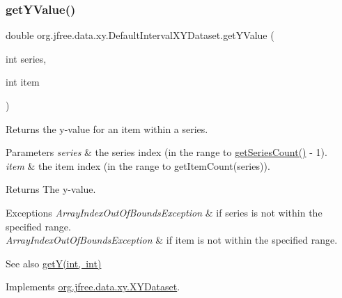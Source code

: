 \subsubsection{\texorpdfstring{get\+Y\+Value()}{getYValue()}}
{\footnotesize\ttfamily double org.\+jfree.\+data.\+xy.\+Default\+Interval\+X\+Y\+Dataset.\+get\+Y\+Value (\begin{DoxyParamCaption}\item[{int}]{series,  }\item[{int}]{item }\end{DoxyParamCaption})}

Returns the y-\/value for an item within a series.


\begin{DoxyParams}{Parameters}
{\em series} & the series index (in the range {} to {\ttfamily \mbox{\hyperlink{classorg_1_1jfree_1_1data_1_1xy_1_1_default_interval_x_y_dataset_a11470bfa9b540c971123d4282c0f5a8a}{get\+Series\+Count()}} -\/ 1}). \\
\hline
{\em item} & the item index (in the range {} to {\ttfamily get\+Item\+Count(series)}).\\
\hline
\end{DoxyParams}
\begin{DoxyReturn}{Returns}
The y-\/value.
\end{DoxyReturn}

\begin{DoxyExceptions}{Exceptions}
{\em Array\+Index\+Out\+Of\+Bounds\+Exception} & if {\ttfamily series} is not within the specified range. \\
\hline
{\em Array\+Index\+Out\+Of\+Bounds\+Exception} & if {\ttfamily item} is not within the specified range.\\
\hline
\end{DoxyExceptions}
\begin{DoxySeeAlso}{See also}
\mbox{\hyperlink{classorg_1_1jfree_1_1data_1_1xy_1_1_default_interval_x_y_dataset_a5085de7f01a34d6599e275e3151c0e1c}{get\+Y(int, int)}} 
\end{DoxySeeAlso}


Implements \mbox{\hyperlink{interfaceorg_1_1jfree_1_1data_1_1xy_1_1_x_y_dataset_a5e86389417eb5ed7b663a952ca370914}{org.\+jfree.\+data.\+xy.\+X\+Y\+Dataset}}.

\mbox{\label{classorg_1_1jfree_1_1data_1_1xy_1_1_default_interval_x_y_dataset_a4bb98970a5ea754b721413cd01e8e5be}} 
